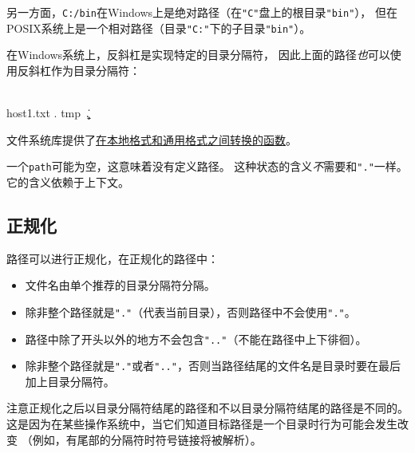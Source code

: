 另一方面，\texttt{C:/bin}在Windows上是绝对路径（在\texttt{"C"}盘上的根目录\texttt{"bin"}），
但在POSIX系统上是一个相对路径（目录\texttt{"C:"}下的子目录\texttt{"bin"}）。

在Windows系统上，反斜杠是实现特定的目录分隔符，
因此上面的路径\emph{也}可以使用反斜杠作为目录分隔符：
\begin{blacklisting}
    \\host1\bin\hello.txt
    .
    tmp\
    \a\b\..\c
\end{blacklisting}
文件系统库提供了\hyperref[ch20.3.4]{在本地格式和通用格式之间转换的函数}。

一个\texttt{path}可能为空，这意味着没有定义路径。
这种状态的含义\emph{不}需要和\texttt{"."}一样。它的含义依赖于上下文。

\subsection{正规化}
路径可以进行正规化，在正规化的路径中：
\begin{itemize}
    \item 文件名由单个推荐的目录分隔符分隔。
    \item 除非整个路径就是\texttt{"."}（代表当前目录），否则路径中不会使用\texttt{"."}。
    \item 路径中除了开头以外的地方不会包含\texttt{".."}（不能在路径中上下徘徊）。
    \item 除非整个路径就是\texttt{"."}或者\texttt{".."}，否则当路径结尾的文件名是目录时要在最后加上目录分隔符。
\end{itemize}
注意正规化之后以目录分隔符结尾的路径和不以目录分隔符结尾的路径是不同的。
这是因为在某些操作系统中，当它们知道目标路径是一个目录时行为可能会发生改变
（例如，有尾部的分隔符时符号链接将被解析）。

